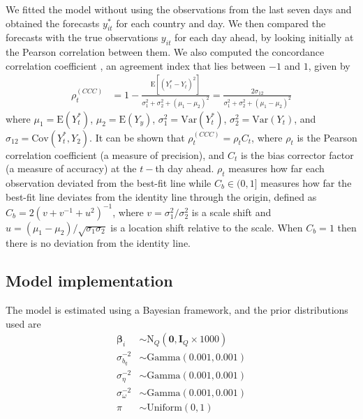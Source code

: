 \documentclass[fleqn,10pt]{wlscirep}
\begin{document}
We fitted the model without using the observations from the last seven days and obtained the forecasts $y_{it}^*$ for each country and day. We then compared the forecasts with the true observations $y_{it}$ for each day ahead, by looking initially at the Pearson correlation between them. We also computed the concordance correlation coefficient \cite{Lin1989, Oliveira2018a}, an agreement index that lies between $-1$ and $1$, given by
\begin{align*}
    \rho^{(CCC)}_t &= 1 -\frac{\mbox{E}\left[\left(Y_{t}^* - Y_{t}\right)^2\right]}{\sigma_{1}^{2}+\sigma_{2}^{2}+\left(\mu_{1}-\mu_{2}\right)^2}=\frac{2\sigma_{12}}{\sigma_{1}^{2}+\sigma_{2}^{2}+\left(\mu_{1}-\mu_{2}\right)^2}
\end{align*}
where $\mu_{1}=\mbox{E}\left(Y_{t}^*\right)$, $\mu_{2}=\mbox{E}\left(Y_{y}\right)$, $\sigma_{1}^{2}= \mbox{Var}\left(Y_{t}^*\right)$, $\sigma_{2}^{2}= \mbox{Var}\left(Y_{t}\right)$, and $\sigma_{12}=\mbox{Cov}\left(Y_{t}^*, Y_{2}\right)$. It can be shown that $\rho^{(CCC)}_t=\rho_t C_t$, where $\rho_t$ is the Pearson correlation coefficient (a measure of precision), and $C_t$ is the bias corrector factor (a measure of accuracy) at the $t-$th day ahead. $\rho_t$ measures how far each observation deviated from the best-fit line while $C_b \in (0,1]$ measures how far the best-fit line deviates from the identity line through the origin, defined as $C_{b}=2\left(v+v^{-1}+u^{2}\right)^{-1}$, where $v = \sigma^2_{1}/\sigma^2_{2}$ is a scale shift and $u = (\mu_{1} - \mu_{2}) / \sqrt{\sigma_1\sigma_2}$ is a location shift relative to the scale. When $C_b=1$ then there is no deviation from the identity line.

\subsection*{Model implementation}

The model is estimated using a Bayesian framework, and the prior distributions used are
\begin{align*}
    \boldsymbol\beta_{i} &\sim \mbox{N}_Q(\mathbf{0}, \mathbf{I}_Q\times1000) \\
    \sigma^{-2}_{b_q} &\sim \mbox{Gamma}(0.001, 0.001) \\
    \sigma^{-2}_{\eta} &\sim \mbox{Gamma}(0.001, 0.001) \\
    \sigma^{-2}_{\omega} &\sim \mbox{Gamma}(0.001, 0.001) \\
    \pi &\sim \mbox{Uniform}(0, 1)
\end{align*}
\end{document}
